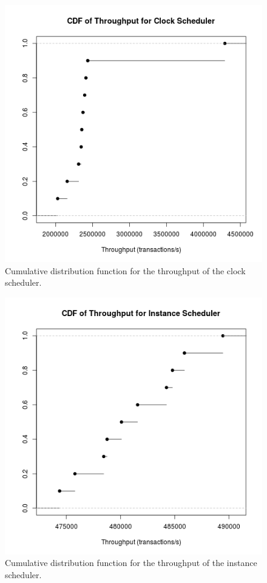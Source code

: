 \begin{figure}
\center
\includegraphics[width=\textwidth]{clock_throughput_cdf.png}
\caption{Cumulative distribution function for the throughput of the clock scheduler. \label{clock_throughput}}
\end{figure}

\begin{figure}
\center
\includegraphics[width=\textwidth]{instance_throughput_cdf.png}
\caption{Cumulative distribution function for the throughput of the instance scheduler. \label{instance_throughput}}
\end{figure}

